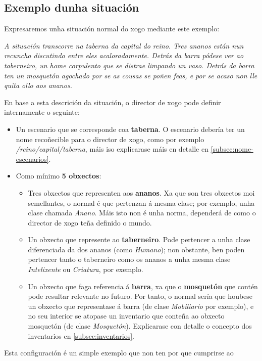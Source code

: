 \subsection{Exemplo dunha situación}
Expresaremos unha situación normal do xogo mediante este exemplo:
\par
{\it A situación transcorre na taberna da capital do reino. Tres ananos están
nun recuncho discutindo entre eles acaloradamente. Detrás da barra pódese ver ao
taberneiro, un home corpulento que se distrae limpando un vaso. Detrás da barra
ten un mosquetón agochado por se as cousas se poñen feas, e por se acaso non
lle quita ollo aos ananos.}
\par
En base a esta descrición da situación, o director de xogo pode definir
internamente o seguinte:
\begin{itemize}
  \item Un escenario que se corresponde coa {\bf taberna}. O escenario debería
  ter un nome recoñecible para o director de xogo, como por exemplo {\it
  /reino/capital/taberna}, máis iso explicarase máis en detalle
  en \ref{subsec:nome-escenarios}.
  \item Como mínimo {\bf 5 obxectos}: \begin{itemize}
    \item Tres obxectos que representen aos {\bf ananos}. Xa que son tres
    obxectos moi semellantes, o normal é que pertenzan á mesma clase; por
    exemplo, unha clase chamada {\it Anano}. Máis isto non é unha norma,
    dependerá de como o director de xogo teña definido o mundo.
    \item Un obxecto que represente ao {\bf taberneiro}. Pode pertencer a unha
    clase diferenciada da dos ananos (como {\it Humano}); non obstante, ben poden
    pertencer tanto o taberneiro como os ananos a unha mesma clase {\it
    Intelixente} ou {\it Criatura}, por exemplo.
    \item Un obxecto que faga referencia á {\bf barra}, xa que o {\bf mosquetón}
    que contén pode resultar relevante no futuro. Por tanto, o normal sería  que
    houbese un obxecto que representase á barra (de clase {\it Mobiliario} por
    exemplo), e no seu interior se atopase un inventario que conteña ao obxecto
    mosquetón (de clase {\it Mosquetón}). Explicarase con detalle o concepto dos
    inventarios en \ref{subsec:inventarios}.
  \end{itemize}
\end{itemize}
\par
Esta configuración é un simple exemplo que non ten por que cumprirse ao
